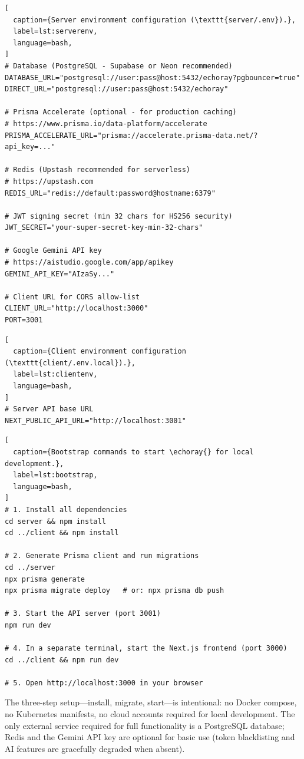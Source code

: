 \begin{lstlisting}[
  caption={Server environment configuration (\texttt{server/.env}).},
  label=lst:serverenv,
  language=bash,
]
# Database (PostgreSQL - Supabase or Neon recommended)
DATABASE_URL="postgresql://user:pass@host:5432/echoray?pgbouncer=true"
DIRECT_URL="postgresql://user:pass@host:5432/echoray"

# Prisma Accelerate (optional - for production caching)
# https://www.prisma.io/data-platform/accelerate
PRISMA_ACCELERATE_URL="prisma://accelerate.prisma-data.net/?api_key=..."

# Redis (Upstash recommended for serverless)
# https://upstash.com
REDIS_URL="redis://default:password@hostname:6379"

# JWT signing secret (min 32 chars for HS256 security)
JWT_SECRET="your-super-secret-key-min-32-chars"

# Google Gemini API key
# https://aistudio.google.com/app/apikey
GEMINI_API_KEY="AIzaSy..."

# Client URL for CORS allow-list
CLIENT_URL="http://localhost:3000"
PORT=3001
\end{lstlisting}

\begin{lstlisting}[
  caption={Client environment configuration (\texttt{client/.env.local}).},
  label=lst:clientenv,
  language=bash,
]
# Server API base URL
NEXT_PUBLIC_API_URL="http://localhost:3001"
\end{lstlisting}

\begin{lstlisting}[
  caption={Bootstrap commands to start \echoray{} for local development.},
  label=lst:bootstrap,
  language=bash,
]
# 1. Install all dependencies
cd server && npm install
cd ../client && npm install

# 2. Generate Prisma client and run migrations
cd ../server
npx prisma generate
npx prisma migrate deploy   # or: npx prisma db push

# 3. Start the API server (port 3001)
npm run dev

# 4. In a separate terminal, start the Next.js frontend (port 3000)
cd ../client && npm run dev

# 5. Open http://localhost:3000 in your browser
\end{lstlisting}

The three-step setup---install, migrate, start---is intentional: no Docker
compose, no Kubernetes manifests, no cloud accounts required for local
development. The only external service required for full functionality is a
PostgreSQL database; Redis and the Gemini API key are optional for basic
use (token blacklisting and AI features are gracefully degraded when absent).

